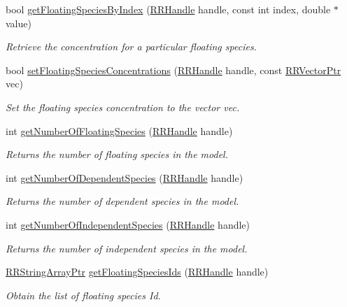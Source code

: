 \begin{DoxyCompactItemize}
bool \hyperlink{group__floating_ga4f8f8270363e5545c94f7b434319807b}{get\-Floating\-Species\-By\-Index} (\hyperlink{rrc__types_8h_a1d68f0592372208fa5a5f2799ea4b3ae}{R\-R\-Handle} handle, const int index, double $\ast$value)
\begin{DoxyCompactList}\small\item\em Retrieve the concentration for a particular floating species. \end{DoxyCompactList}\item 
bool \hyperlink{group__floating_gaf0efd671999c1689be3614e4af162bc2}{set\-Floating\-Species\-Concentrations} (\hyperlink{rrc__types_8h_a1d68f0592372208fa5a5f2799ea4b3ae}{R\-R\-Handle} handle, const \hyperlink{rrc__types_8h_a3be72d6006034fd349f753d2bf441bf7}{R\-R\-Vector\-Ptr} vec)
\begin{DoxyCompactList}\small\item\em Set the floating species concentration to the vector vec. \end{DoxyCompactList}\item 
int \hyperlink{group__floating_ga71c45e94c31e5632a3c4815da05bec9a}{get\-Number\-Of\-Floating\-Species} (\hyperlink{rrc__types_8h_a1d68f0592372208fa5a5f2799ea4b3ae}{R\-R\-Handle} handle)
\begin{DoxyCompactList}\small\item\em Returns the number of floating species in the model. \end{DoxyCompactList}\item 
int \hyperlink{group__floating_ga6038680c2da9d284277d9b73bb0c2a40}{get\-Number\-Of\-Dependent\-Species} (\hyperlink{rrc__types_8h_a1d68f0592372208fa5a5f2799ea4b3ae}{R\-R\-Handle} handle)
\begin{DoxyCompactList}\small\item\em Returns the number of dependent species in the model. \end{DoxyCompactList}\item 
int \hyperlink{group__floating_ga2c4d57dbedac2ccdf4ee9605d6a53932}{get\-Number\-Of\-Independent\-Species} (\hyperlink{rrc__types_8h_a1d68f0592372208fa5a5f2799ea4b3ae}{R\-R\-Handle} handle)
\begin{DoxyCompactList}\small\item\em Returns the number of independent species in the model. \end{DoxyCompactList}\item 
\hyperlink{rrc__types_8h_a7c9475df6c7337d99482b13a365e7596}{R\-R\-String\-Array\-Ptr} \hyperlink{group__floating_ga18277715f5f3df21eaee5f99d65ed7b7}{get\-Floating\-Species\-Ids} (\hyperlink{rrc__types_8h_a1d68f0592372208fa5a5f2799ea4b3ae}{R\-R\-Handle} handle)
\begin{DoxyCompactList}\small\item\em Obtain the list of floating species Id. \end{DoxyCompactList}\end{DoxyCompactItemize}


